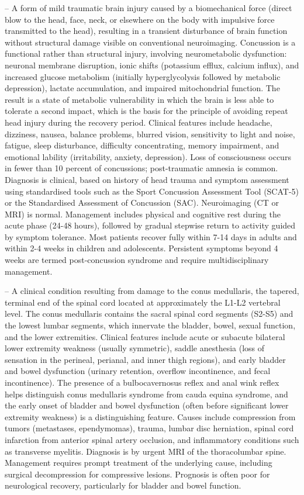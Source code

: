 -- A form of mild traumatic brain injury caused by a biomechanical force (direct blow to the head, face, neck, or elsewhere on the body with impulsive force transmitted to the head), resulting in a transient disturbance of brain function without structural damage visible on conventional neuroimaging. Concussion is a functional rather than structural injury, involving neurometabolic dysfunction: neuronal membrane disruption, ionic shifts (potassium efflux, calcium influx), and increased glucose metabolism (initially hyperglycolysis followed by metabolic depression), lactate accumulation, and impaired mitochondrial function. The result is a state of metabolic vulnerability in which the brain is less able to tolerate a second impact, which is the basis for the principle of avoiding repeat head injury during the recovery period. Clinical features include headache, dizziness, nausea, balance problems, blurred vision, sensitivity to light and noise, fatigue, sleep disturbance, difficulty concentrating, memory impairment, and emotional lability (irritability, anxiety, depression). Loss of consciousness occurs in fewer than 10 percent of concussions; post-traumatic amnesia is common. Diagnosis is clinical, based on history of head trauma and symptom assessment using standardised tools such as the Sport Concussion Assessment Tool (SCAT-5) or the Standardised Assessment of Concussion (SAC). Neuroimaging (CT or MRI) is normal. Management includes physical and cognitive rest during the acute phase (24-48 hours), followed by gradual stepwise return to activity guided by symptom tolerance. Most patients recover fully within 7-14 days in adults and within 2-4 weeks in children and adolescents. Persistent symptoms beyond 4 weeks are termed post-concussion syndrome and require multidisciplinary management.

-- A clinical condition resulting from damage to the conus medullaris, the tapered, terminal end of the spinal cord located at approximately the L1-L2 vertebral level. The conus medullaris contains the sacral spinal cord segments (S2-S5) and the lowest lumbar segments, which innervate the bladder, bowel, sexual function, and the lower extremities. Clinical features include acute or subacute bilateral lower extremity weakness (usually symmetric), saddle anesthesia (loss of sensation in the perineal, perianal, and inner thigh regions), and early bladder and bowel dysfunction (urinary retention, overflow incontinence, and fecal incontinence). The presence of a bulbocavernosus reflex and anal wink reflex helps distinguish conus medullaris syndrome from cauda equina syndrome, and the early onset of bladder and bowel dysfunction (often before significant lower extremity weakness) is a distinguishing feature. Causes include compression from tumors (metastases, ependymomas), trauma, lumbar disc herniation, spinal cord infarction from anterior spinal artery occlusion, and inflammatory conditions such as transverse myelitis. Diagnosis is by urgent MRI of the thoracolumbar spine. Management requires prompt treatment of the underlying cause, including surgical decompression for compressive lesions. Prognosis is often poor for neurological recovery, particularly for bladder and bowel function.

